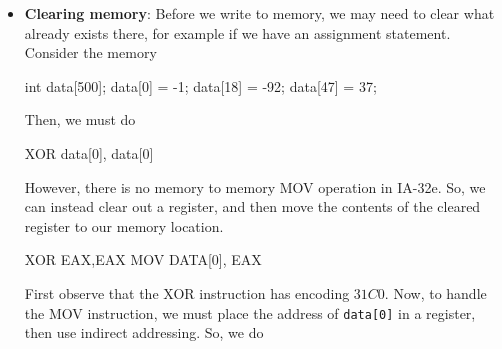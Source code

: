\documentclass{report}
\begin{document}
\begin{itemize}
            \bigbreak \noindent 
            Recall the high order two bits of the ModR/m byte:
            \begin{itemize}
                \item \textbf{00:} Memory operand, no displacement (except special cases)
                \item \textbf{01:} Memory operand + 8-bit displacement
                \item \textbf{10:} Memory operand + 32-bit displacement (16-bit in 16-bit mode)
                \item \textbf{11:} Register operand (no memory access)
            \end{itemize}
            Thus, we no longer use $\text{mod} = 11$, in the case above, we use $\text{mod}=00$. So, the reg bits are $000$ (eax), and the r/m bits are $110$ (esi), and the byte is therefore
            \begin{align*}
                0b00000110 = 0x06
            .\end{align*}
            When a displacement is present, the value of that displacement (in bytes) comes after the ModR/m byte in the encoding (in hex).
        \item \textbf{Clearing memory}: Before we write to memory, we may need to clear what already exists there, for example if we have an assignment statement. Consider the memory
            \bigbreak \noindent 
            \begin{cppcode}
                int data[500];
                data[0] = -1;
                data[18] = -92;
                data[47] = 37;
            \end{cppcode}
            \bigbreak \noindent 
            Then, we must do 
            \bigbreak \noindent 
            \begin{cppcode}
                XOR    data[0], data[0]
            \end{cppcode}
            \bigbreak \noindent 
            However, there is no memory to memory MOV operation in IA-32e. So, we can instead clear out a register, and then move the contents of the cleared register to our memory location.
            \bigbreak \noindent 
            \begin{cppcode}
            XOR    EAX,EAX
            MOV    DATA[0], EAX
            \end{cppcode}
            \bigbreak \noindent 
            First observe that the XOR instruction has encoding $31C0$. Now, to handle the MOV instruction, we must place the address of \texttt{data[0]} in a register, then use indirect addressing. So, we do

\end{itemize}
\end{document}
